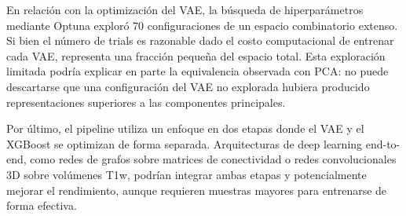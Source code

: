 En relación con la optimización del VAE, la búsqueda de hiperparámetros mediante Optuna exploró 70 configuraciones de un espacio combinatorio extenso. Si bien el número de trials es razonable dado el costo computacional de entrenar cada VAE, representa una fracción pequeña del espacio total. Esta exploración limitada podría explicar en parte la equivalencia observada con PCA: no puede descartarse que una configuración del VAE no explorada hubiera producido representaciones superiores a las componentes principales.

Por último, el pipeline utiliza un enfoque en dos etapas donde el VAE y el XGBoost se optimizan de forma separada. Arquitecturas de deep learning end-to-end, como redes de grafos sobre matrices de conectividad o redes convolucionales 3D sobre volúmenes T1w, podrían integrar ambas etapas y potencialmente mejorar el rendimiento, aunque requieren muestras mayores para entrenarse de forma efectiva.